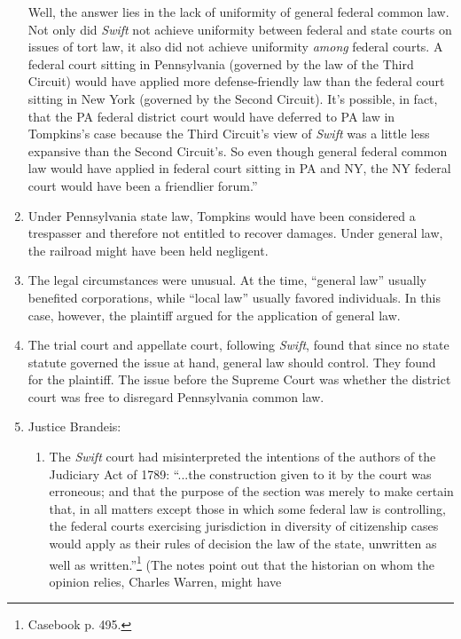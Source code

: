 \begin{enumerate}
{    Well, the answer lies in the lack of uniformity of general federal
    common law. Not only did \emph{Swift} not achieve uniformity between 
    federal and state courts on issues of tort law, it also did not achieve 
    uniformity \emph{among} federal courts. A federal court sitting in 
    Pennsylvania (governed by the law of the Third Circuit) would have applied 
    more defense-friendly law than the federal court sitting in New York 
    (governed by the Second Circuit). It's possible, in fact, that the PA 
    federal district court would have deferred to PA law in Tompkins's case 
    because the Third Circuit's view of \emph{Swift} was a little less 
    expansive than the Second Circuit's. So even though general federal 
    common law would have applied in federal court sitting in PA and NY, the 
    NY federal court would have been a friendlier forum.''}
    \item Under Pennsylvania state law, Tompkins would have been considered a 
    trespasser and therefore not entitled to recover damages. Under general 
    law, the railroad might have been held negligent.
    \item The legal circumstances were unusual. At the time, ``general law'' 
    usually benefited corporations, while ``local law'' usually favored 
    individuals. In this case, however, the plaintiff argued for the 
    application of general law.
    \item The trial court and appellate court, following \emph{Swift}, found 
    that since no state statute governed the issue at hand, general law should 
    control. They found for the plaintiff. The issue before the Supreme Court 
    was whether the district court was free to disregard Pennsylvania common 
    law.
    \item Justice Brandeis:
    \begin{enumerate}
        \item The \emph{Swift} court had misinterpreted the intentions of the 
        authors of the Judiciary Act of 1789: ``...the construction given to 
        it by the court was erroneous; and that the purpose of the section was 
        merely to make certain that, in all matters except those in which some 
        federal law is controlling, the federal courts exercising jurisdiction 
        in diversity of citizenship cases would apply as their rules of 
        decision the law of the state, unwritten as well as 
        written.''\footnote{Casebook p. 495.} (The notes point out that the 
        historian on whom the opinion relies, Charles Warren, might have 

\end{enumerate}
\end{enumerate}
